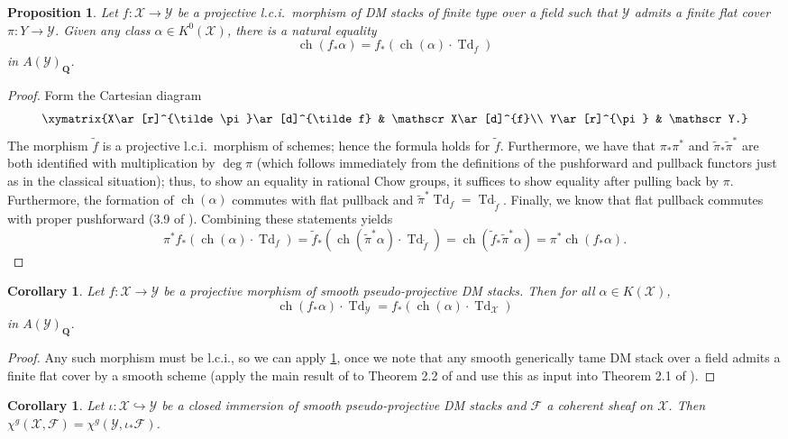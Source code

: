 \documentclass[11pt]{amsart}
\newcommand{\field}[1]{\mathbf #1}
\newcommand{\ms}[1]{\mathscr #1}
\newcommand{\Q}{\field Q}
\newcommand{\td}{\operatorname{Td}}
\DeclareMathOperator{\chern}{ch}
\renewcommand{\[}{[\!\hspace{0.03em}[}
\renewcommand{\]}{]\!\hspace{0.03em}]}
\renewcommand{\(}{(\!\hspace{0.03em}(}
\renewcommand{\)}{)\!\hspace{0.03em})}
\newcommand{\inj}{\hookrightarrow}
\newtheorem{prop}[lem]{Proposition}
\newtheorem{cor}[lem]{Corollary}
\theoremstyle{definition}
\theoremstyle{remark}
\begin{document}
\begin{prop}\label{P:gen rr} Let $f:\ms X\to\ms Y$ be a projective 
l.c.i.\ morphism of DM stacks of finite type over a field 
such that $\ms Y$ admits a finite flat cover $\pi:Y\to\ms Y$.  
Given any class $\alpha\in K^{0}(\ms X)$, there is a natural equality
$$\chern(f_{\ast}\alpha)=f_{\ast}(\chern(\alpha)\cdot\td_{f})$$
in $A(\ms Y)_{\Q}$.
\end{prop}
\begin{proof} Form the Cartesian diagram
    $$\xymatrix{X\ar[r]^{\tilde\pi}\ar[d]^{\tilde f} & \ms X\ar[d]^{f}\\
    Y\ar[r]^{\pi} & \ms Y.}$$
The morphism $\tilde f$ is a projective l.c.i.\ morphism of schemes; 
hence the formula holds for $\tilde f$.  Furthermore, we have that 
$\pi_{\ast}\pi^{\ast}$ and $\tilde\pi_{\ast}\tilde\pi^{\ast}$ are both 
identified with multiplication by $\deg\pi$ (which follows immediately from the definitions of the pushforward and pullback functors just as in the classical situation); thus, to show an equality 
in rational Chow groups, it suffices to show equality after pulling 
back by $\pi$.  Furthermore, the 
formation of $\chern(\alpha)$ commutes with flat pullback and 
$\tilde\pi^{\ast}\td_{f}=\td_{\tilde f}$.  Finally, we know that 
flat pullback commutes with proper pushforward (3.9 of \cite{vistoli}).  
Combining these statements yields 
$$\pi^{\ast}f_{\ast}(\chern(\alpha)\cdot\td_{f})=\tilde 
f_{\ast}(\chern(\tilde\pi^{\ast}\alpha)\cdot\td_{\tilde f})=\chern(\tilde 
f_{\ast}\tilde\pi^{\ast}\alpha)=\pi^{\ast}\chern(f_{\ast}\alpha).$$
\end{proof}

\begin{cor}\label{P:rr} Let $f:\ms X\to \ms Y$ be a projective morphism of 
smooth pseudo-projective DM stacks.  Then for all $\alpha\in K(\ms 
X)$,
$$\chern(f_{\ast}\alpha)\cdot\td_{\ms Y}=f_{\ast}(\chern(\alpha)\cdot\td_{\ms 
X})$$
in $A(\ms Y)_{\Q}$.
\end{cor}
\begin{proof} Any such morphism must be l.c.i., so we can apply 
\ref{P:gen rr}, once we note that any smooth generically tame DM 
stack over a field admits a finite flat cover by a smooth scheme 
(apply the main result of \cite{dejong-gabber} to Theorem 2.2 of 
\cite{vistoli-kresch} and use this as input into Theorem 2.1 of 
\cite{vistoli-kresch}).
\end{proof}

\begin{cor}\label{C:hrr closed immersion} Let $\iota:\ms X\inj\ms Y$ be 
a closed immersion of smooth pseudo-projective DM stacks and $\ms F$ a coherent sheaf on $\ms X$.  
Then $\chi^{g}(\ms X,\ms F)=\chi^{g}(\ms Y,\iota_{\ast}\ms F)$.
\end{cor}
\end{document}
